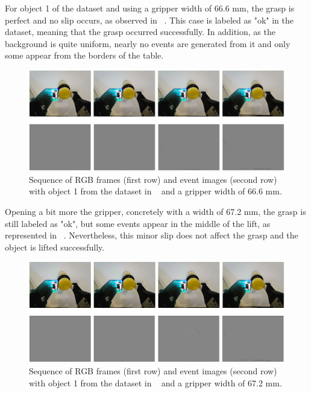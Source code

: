 For object 1 of the dataset and using a gripper width of 66.6 mm, the grasp is perfect and no slip occurs, as observed in ~. This case is labeled as "ok" in the dataset, meaning that the grasp occurred successfully. In addition, as the background is quite uniform, nearly no events are generated from it and only some appear from the borders of the table.

\begin{figure}[H]
    \centering
    \includegraphics[width=\textwidth]{resources/images/gelsight_case1}
    \caption{Sequence of RGB frames (first row) and event images (second row) with object 1 from the dataset in ~\cite{gelsight2018} and a gripper width of 66.6 mm.}\label{fig:gelsight_case1}
\end{figure}

Opening a bit more the gripper, concretely with a width of 67.2 mm, the grasp is still labeled as "ok", but some events appear in the middle of the lift, as represented in ~. Nevertheless, this minor slip does not affect the grasp and the object is lifted successfully.

\begin{figure}[H]
    \centering
    \includegraphics[width=\textwidth]{resources/images/gelsight_case2}
    \caption{Sequence of RGB frames (first row) and event images (second row) with object 1 from the dataset in ~\cite{gelsight2018} and a gripper width of 67.2 mm.}\label{fig:gelsight_case2}
\end{figure}

